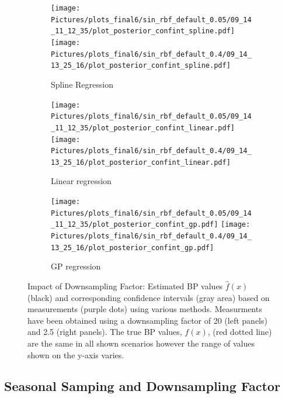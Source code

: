 \begin{figure}
\begin{subfigure}{\textwidth}
    \centering
    \texttt{[image: 
       Pictures/plots\_final6/sin\_rbf\_default\_0.05/09\_14\_11\_12\_35/plot\_posterior\_confint\_spline.pdf]}
    \texttt{[image: 
      Pictures/plots\_final6/sin\_rbf\_default\_0.4/09\_14\_13\_25\_16/plot\_posterior\_confint\_spline.pdf]}
  \caption{Spline Regression }
\end{subfigure}

\begin{subfigure}{\textwidth}
    \centering
    \texttt{[image: 
       Pictures/plots\_final6/sin\_rbf\_default\_0.05/09\_14\_11\_12\_35/plot\_posterior\_confint\_linear.pdf]}
    \texttt{[image: 
  Pictures/plots\_final6/sin\_rbf\_default\_0.4/09\_14\_13\_25\_16/plot\_posterior\_confint\_linear.pdf]}
  \caption{Linear regression }
\end{subfigure}

\begin{subfigure}{\textwidth}
    \centering
    \texttt{[image: 
       Pictures/plots\_final6/sin\_rbf\_default\_0.05/09\_14\_11\_12\_35/plot\_posterior\_confint\_gp.pdf]}
    \texttt{[image: 
  Pictures/plots\_final6/sin\_rbf\_default\_0.4/09\_14\_13\_25\_16/plot\_posterior\_confint\_gp.pdf]}
  \caption{GP regression}
\end{subfigure}\hfill

\caption[Impact of Downsampling Factor]{Impact of Downsampling Factor:
    Estimated BP values $\hat{f}(x)$ (black) and corresponding confidence intervals
    (gray area) based on measurements (purple dots) using various methods.
    Measurments have been obtained using a
    downsampling factor of 20 (left panels) and 2.5 (right panels).
    The true BP values, $f(x)$, (red dotted line) are the same in all shown
    scenarios however the range of values shown on the y-axis varies.
    }
\label{fig:ex-downsampling-factor}
\end{figure}

\subsection{Seasonal Samping and Downsampling Factor}




